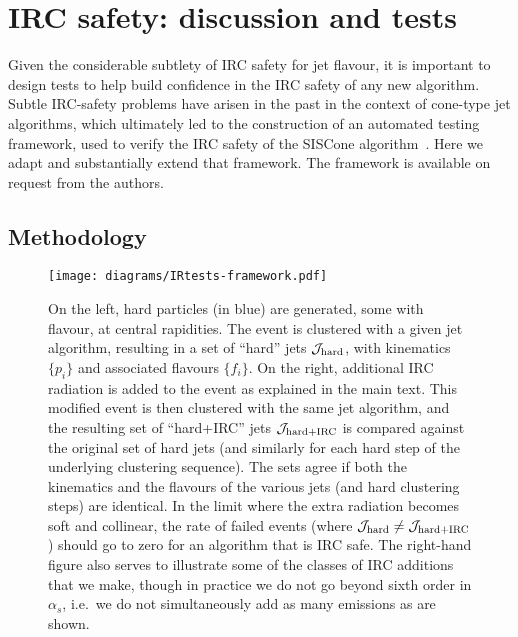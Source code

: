\documentclass[nofootinbib,twocolumn,preprintnumbers,superscriptaddress,aps]{revtex4-2}
\newcommand{\as}{\alpha_s}
\newcommand{\Jhard}{\mathcal{J}_{\rm hard}}
\newcommand{\JhardIRC}{\mathcal{J}_{\rm hard+IRC}}
\begin{document}
\section{IRC safety: discussion and tests}
\label{sec:IRC-tests}


Given the considerable subtlety of IRC safety for jet flavour, it is
important to design tests to help build confidence in the IRC safety
of any new algorithm.
%
Subtle IRC-safety problems have arisen in the past in the context of
cone-type jet algorithms, which ultimately led to
the construction of an automated testing framework, used to verify the
IRC safety of the SISCone algorithm~\cite{Salam:2007xv}.
%
Here we adapt and substantially extend that framework.
%
The framework is available on request from the authors.

\subsection{Methodology}
\label{sec:IRC-methodology}

\begin{figure}
  \centering
  \texttt{[image: diagrams/IRtests-framework.pdf]}
  \caption{
    On the left, hard particles (in blue) are generated, some with flavour, at central
    rapidities. The event is clustered with a given jet algorithm,
    resulting in a set of ``hard'' jets $\Jhard$, with
    kinematics $\{p_i\}$ and associated flavours $\{f_i\}$.
    On the right, additional IRC radiation is added to the event as explained in the
    main text. This modified event is then clustered with the same
    jet algorithm, and the resulting set of ``hard+IRC'' jets $\JhardIRC$
    is compared against the original set of hard jets (and similarly for each hard
    step of the underlying clustering sequence).
    The sets agree
    if both the kinematics and the flavours of the various jets (and
    hard clustering steps) are
    identical. In the limit where the extra radiation becomes soft
    and collinear, the rate of failed events (where $\Jhard \neq \JhardIRC$)
    should go to zero for an algorithm that is IRC safe.
    The right-hand figure also serves to illustrate some of the
    classes of IRC additions that we make, though in practice we do
    not go beyond sixth order in $\as$, i.e.\ we do not simultaneously
    add as many emissions as are shown.  }
  \label{fig:IRtests-framework}
\end{figure}
\end{document}
